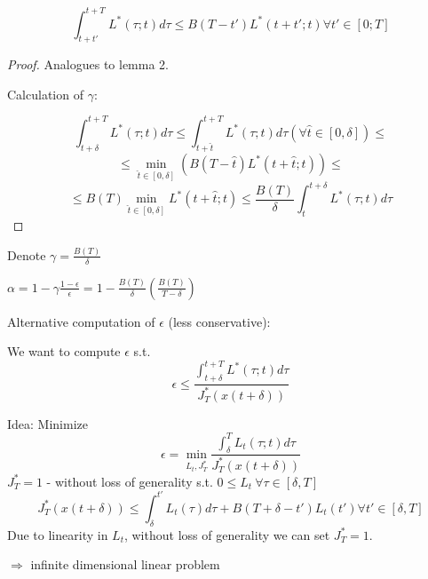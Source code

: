 \begin{Lemma}

\begin{equation*}
\int_{t+t'}^{t+T}L^*(\tau;t)d\tau \leq B(T-t')L^*(t+t';t) \forall t' \in [0;T]
\end{equation*}

\begin{proof}
Analogues to lemma 2.

Calculation of $\gamma$:

\begin{equation*}
\int_{t+\delta}^{t+T} L^*(\tau;t)d\tau \leq \int_{t+\hat t}^{t+T}L^*(\tau;t)d\tau (\forall \hat t \in [0,\delta]) \leq
\end{equation*}
\begin{equation*}
\leq \min_{\hat t \in [0, \delta]}(B(T-\hat t)L^*(t+\hat t;t)) \leq
\end{equation*}
\begin{equation*}
\leq B(T)\min_{\hat t \in [0,\delta]}L^*(t+\hat t;t) \leq \frac{B(T)}{\delta}\int_{t}^{t+\delta}L^*(\tau;t)d\tau
\end{equation*}
\end{proof}
\end{Lemma}

Denote $\gamma = \frac{B(T)}{\delta}$

$\alpha = 1 - \gamma \frac{1-\epsilon}{\epsilon} = 1 - \frac{B(T)}{\delta}(\frac{B(T)}{T-\delta})$

Alternative computation of $\epsilon$ (less conservative):

We want to compute $\epsilon$ s.t.
\begin{equation*}
\epsilon \leq \frac{\int_{t+\delta}^{t+T}L^*(\tau;t)d\tau}{J_T^*(x(t+\delta))}
\end{equation*}

Idea: Minimize 
\begin{equation}\label{minimizer_eps}
\epsilon = \min_{L_t,J^*_T}\frac{\int_{\delta}^{T}L_t(\tau;t)d\tau}{J_T^*(x(t+\delta))}
\end{equation}
$J^*_T = 1$ - without loss of generality
s.t. $0 \leq L_t \ \forall \tau \in [\delta,T]$
\begin{equation*}
J^*_T(x(t+\delta)) \leq \int_{\delta}^{t'}L_t(\tau)d\tau + B(T+\delta-t')L_t(t') \forall t' \in [\delta, T]
\end{equation*}
Due to linearity in $L_t$, without loss of generality we can set $J_T^* = 1$.

$\Rightarrow$ infinite dimensional linear problem

